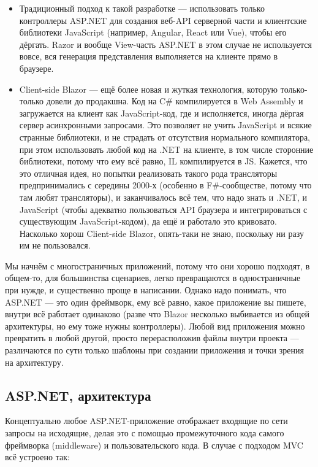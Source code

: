 \documentclass{../../text-style}
\begin{document}
\begin{itemize}
\begin{itemize}
        \item Традиционный подход к такой разработке --- использовать только контроллеры ASP.NET для создания веб-API серверной части и клиентские библиотеки JavaScript (например, Angular, React или Vue), чтобы его дёргать. Razor и вообще View-часть ASP.NET в этом случае не используется вовсе, вся генерация представления выполняется на клиенте прямо в браузере.
        \item Client-side Blazor --- ещё более новая и жуткая технология, которую только-только довели до продакшна. Код на C\# компилируется в Web Assembly и загружается на клиент как JavaScript-код, где и исполняется, иногда дёргая сервер асинхронными запросами. Это позволяет не учить JavaScript и всякие странные библиотеки, и не страдать от отсутствия нормального компилятора, при этом использовать любой код на .NET на клиенте, в том числе сторонние библиотеки, потому что ему всё равно, IL компилируется в JS. Кажется, что это отличная идея, но попытки реализовать такого рода трансляторы предпринимались с середины 2000-х (особенно в F\#-сообществе, потому что там любят трансляторы), и заканчивалось всё тем, что надо знать и .NET, и JavaScript (чтобы адекватно пользоваться API браузера и интегрироваться с существующим JavaScript-кодом), да ещё и работало это кривовато. Насколько хорош Client-side Blazor, опять-таки не знаю, поскольку ни разу им не пользовался.
    \end{itemize}
\end{itemize}

Мы начнём с многостраничных приложений, потому что они хорошо подходят, в общем-то, для большинства сценариев, легко превращаются в одностраничные при нужде, и существенно проще в написании. Однако надо понимать, что ASP.NET --- это один фреймворк, ему всё равно, какое приложение вы пишете, внутри всё работает одинаково (разве что Blazor несколько выбивается из общей архитектуры, но ему тоже нужны контроллеры). Любой вид приложения можно превратить в любой другой, просто перерасположив файлы внутри проекта --- различаются по сути только шаблоны при создании приложения и точки зрения на архитектуру.

\subsection{ASP.NET, архитектура}

Концептуально любое ASP.NET-приложение отображает входящие по сети запросы на исходящие, делая это с помощью промежуточного кода самого фреймворка (middleware) и пользовательского кода. В случае с подходом MVC всё устроено так:
\end{document}
